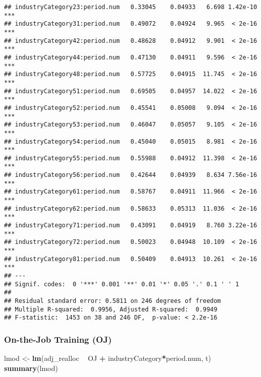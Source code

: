 \documentclass[
]{article}
\newenvironment{Shaded}{\begin{snugshade}}{\end{snugshade}}
\newcommand{\KeywordTok}[1]{\textcolor[rgb]{0.13,0.29,0.53}{\textbf{#1}}}
\newcommand{\NormalTok}[1]{#1}
\newcommand{\OperatorTok}[1]{\textcolor[rgb]{0.81,0.36,0.00}{\textbf{#1}}}
\newcommand{\StringTok}[1]{\textcolor[rgb]{0.31,0.60,0.02}{#1}}
\begin{document}
\begin{verbatim}
## industryCategory23:period.num   0.33045    0.04933   6.698 1.42e-10 ***
## industryCategory31:period.num   0.49072    0.04924   9.965  < 2e-16 ***
## industryCategory42:period.num   0.48628    0.04912   9.901  < 2e-16 ***
## industryCategory44:period.num   0.47130    0.04911   9.596  < 2e-16 ***
## industryCategory48:period.num   0.57725    0.04915  11.745  < 2e-16 ***
## industryCategory51:period.num   0.69505    0.04957  14.022  < 2e-16 ***
## industryCategory52:period.num   0.45541    0.05008   9.094  < 2e-16 ***
## industryCategory53:period.num   0.46047    0.05057   9.105  < 2e-16 ***
## industryCategory54:period.num   0.45040    0.05015   8.981  < 2e-16 ***
## industryCategory55:period.num   0.55988    0.04912  11.398  < 2e-16 ***
## industryCategory56:period.num   0.42644    0.04939   8.634 7.56e-16 ***
## industryCategory61:period.num   0.58767    0.04911  11.966  < 2e-16 ***
## industryCategory62:period.num   0.58633    0.05313  11.036  < 2e-16 ***
## industryCategory71:period.num   0.43091    0.04919   8.760 3.22e-16 ***
## industryCategory72:period.num   0.50023    0.04948  10.109  < 2e-16 ***
## industryCategory81:period.num   0.50409    0.04913  10.261  < 2e-16 ***
## ---
## Signif. codes:  0 '***' 0.001 '**' 0.01 '*' 0.05 '.' 0.1 ' ' 1
## 
## Residual standard error: 0.5811 on 246 degrees of freedom
## Multiple R-squared:  0.9956, Adjusted R-squared:  0.9949 
## F-statistic:  1453 on 38 and 246 DF,  p-value: < 2.2e-16
\end{verbatim}

\hypertarget{on-the-job-training-oj}{%
\subsubsection{On-the-Job Training (OJ)}\label{on-the-job-training-oj}}

\begin{Shaded}
\begin{Highlighting}[]
\NormalTok{lmod <-}\StringTok{ }\KeywordTok{lm}\NormalTok{(adj_realloc }\OperatorTok{~}\StringTok{  }\NormalTok{OJ }\OperatorTok{+}\StringTok{ }\NormalTok{industryCategory}\OperatorTok{*}\NormalTok{period.num, t)}
\KeywordTok{summary}\NormalTok{(lmod)}
\end{Highlighting}
\end{Shaded}
\end{document}
